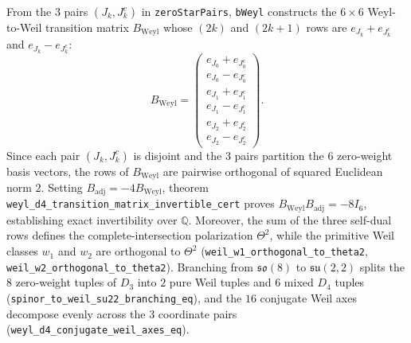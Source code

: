 \documentclass[11pt,a4paper]{article}
\begin{document}
From the $3$ pairs $(J_k, J_k^c)$ in \texttt{zeroStarPairs}, \texttt{bWeyl} constructs the $6 \times 6$ Weyl-to-Weil transition matrix $B_{\mathrm{Weyl}}$ whose $(2k)$ and $(2k+1)$ rows are $e_{J_k} + e_{J_k^c}$ and $e_{J_k} - e_{J_k^c}$:
\begin{equation}
  B_{\mathrm{Weyl}} = \begin{pmatrix}
    e_{J_0} + e_{J_0^c} \\ e_{J_0} - e_{J_0^c} \\
    e_{J_1} + e_{J_1^c} \\ e_{J_1} - e_{J_1^c} \\
    e_{J_2} + e_{J_2^c} \\ e_{J_2} - e_{J_2^c}
  \end{pmatrix}.
\end{equation}
Since each pair $(J_k, J_k^c)$ is disjoint and the $3$ pairs partition the $6$ zero-weight basis vectors, the rows of $B_{\mathrm{Weyl}}$ are pairwise orthogonal of squared Euclidean norm $2$. Setting $B_{\mathrm{adj}} = -4 B_{\mathrm{Weyl}}$, theorem \texttt{weyl\_d4\_transition\_matrix\_invertible\_cert} proves $B_{\mathrm{Weyl}} B_{\mathrm{adj}} = -8 I_6$, establishing exact invertibility over $\mathbb{Q}$. Moreover, the sum of the three self-dual rows defines the complete-intersection polarization $\Theta^2$, while the primitive Weil classes $w_1$ and $w_2$ are orthogonal to $\Theta^2$ (\texttt{weil\_w1\_orthogonal\_to\_theta2}, \texttt{weil\_w2\_orthogonal\_to\_theta2}). Branching from $\mathfrak{so}(8)$ to $\mathfrak{su}(2,2)$ splits the $8$ zero-weight tuples of $D_3$ into $2$ pure Weil tuples and $6$ mixed $D_4$ tuples (\texttt{spinor\_to\_weil\_su22\_branching\_eq}), and the $16$ conjugate Weil axes decompose evenly across the $3$ coordinate pairs (\texttt{weyl\_d4\_conjugate\_weil\_axes\_eq}).
\end{document}

